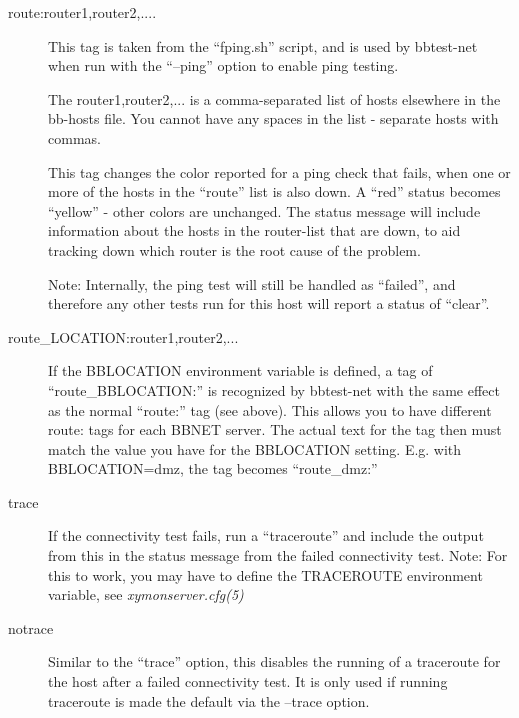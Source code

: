 \begin{description}
 

\item[route:router1,router2,....] This tag is taken from the ``fping.sh'' script, and is used by bbtest-net when run with the ``--ping'' option to enable ping testing. 

  The router1,router2,... is a comma-separated list of hosts elsewhere in the bb-hosts file. You cannot have any spaces in the list - separate hosts with commas. 


  This tag changes the color reported for a ping check that fails,
  when one or more of the hosts in the ``route'' list is also down. A
  ``red'' status becomes ``yellow'' - other colors are unchanged. The
  status message will include information about the hosts in the
  router-list that are down, to aid tracking down which router is the
  root cause of the problem. 



  Note: Internally, the ping test will still be handled as ``failed'',
  and therefore any other tests run for this host will report a status
  of ``clear''. 



 

\item[route\_LOCATION:router1,router2,...] If the BBLOCATION
  environment variable is defined, a tag of ``route\_BBLOCATION:'' is
  recognized by bbtest-net with the same effect as the normal
  ``route:'' tag (see above). This allows you to have different route:
  tags for each BBNET server. The actual text for the tag then must
  match the value you have for the BBLOCATION setting. E.g. with
  BBLOCATION=dmz, the tag becomes ``route\_dmz:'' 


 

\item[trace] If the connectivity test fails, run a ``traceroute'' and
  include the output from this in the status message from the failed
  connectivity test. Note: For this to work, you may have to define
  the TRACEROUTE environment variable, see \emph{xymonserver.cfg(5)}



 

\item[notrace] Similar to the ``trace'' option, this disables the
  running of a traceroute for the host after a failed connectivity
  test. It is only used if running traceroute is made the default via
  the --trace option. 


 


\end{description}

